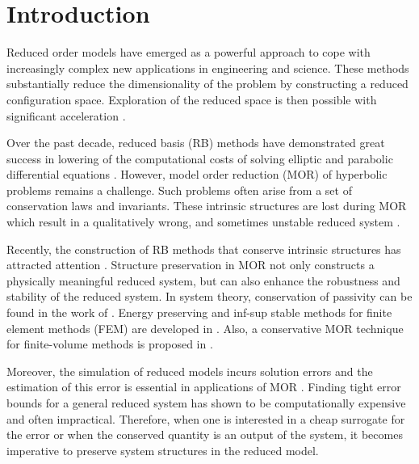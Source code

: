 \section{Introduction}
\label{sec:intro}

Reduced order models have emerged as a powerful approach to cope with increasingly complex new applications in engineering and science. These methods substantially reduce the dimensionality of the problem by constructing a reduced configuration space. Exploration of the reduced space is then possible with significant acceleration \cite{hesthaven2015certified,Haasdonk2017}.

Over the past decade, reduced basis (RB) methods have demonstrated great success in lowering of the computational costs of solving elliptic and parabolic differential equations \cite{ito1998reduced,ito2001reduced}. However, model order reduction (MOR) of hyperbolic problems remains a challenge. Such problems often arise from a set of conservation laws and invariants. These intrinsic structures are lost during MOR which result in a qualitatively wrong, and sometimes unstable reduced system \cite{Amsallem:2014ef}.


Recently, the construction of RB methods that conserve intrinsic structures has attracted attention \cite{doi:10.1137/17M1111991,1705.00498,kalashnikova2014stabilization,farhat2015structure,doi:10.1137/110836742,doi:10.1137/140959602,beattie2011structure,doi:10.1137/140978922}. Structure preservation in MOR not only constructs a physically meaningful reduced system, but can also enhance the robustness and stability of the reduced system. In system theory, conservation of passivity can be found in the work of \cite{polyuga2010structure,gugercin2012structure}. Energy preserving and inf-sup stable methods for finite element methods (FEM) are developed in \cite{farhat2015structure,ballarin2015supremizer}. Also, a conservative MOR technique for finite-volume methods is proposed in \cite{1711.11550}.

Moreover, the simulation of reduced models incurs solution errors and the estimation of this error is essential in applications of MOR \cite{HaasdonkOhlberger11,RuinerEtAl12,BhattEtAl18}. Finding tight error bounds for a general reduced system has shown to be computationally expensive and often impractical. Therefore, when one is interested in a cheap surrogate for the error or when the conserved quantity is an output of the system, it becomes imperative to preserve system structures in the reduced model.

